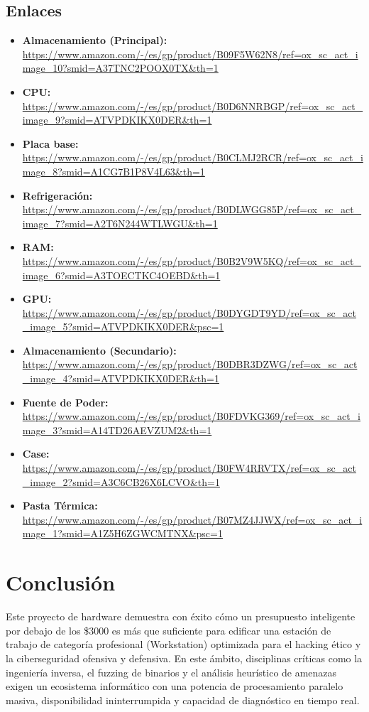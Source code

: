 \documentclass[12pt, a4paper]{article}
\begin{document}
\subsection*{Enlaces}
\begin{itemize}
    \item \textbf{Almacenamiento (Principal):} \url{https://www.amazon.com/-/es/gp/product/B09F5W62N8/ref=ox_sc_act_image_10?smid=A37TNC2POOX0TX&th=1}
    \item \textbf{CPU:} \url{https://www.amazon.com/-/es/gp/product/B0D6NNRBGP/ref=ox_sc_act_image_9?smid=ATVPDKIKX0DER&th=1}
    \item \textbf{Placa base:} \url{https://www.amazon.com/-/es/gp/product/B0CLMJ2RCR/ref=ox_sc_act_image_8?smid=A1CG7B1P8V4L63&th=1}
    \item \textbf{Refrigeración:} \url{https://www.amazon.com/-/es/gp/product/B0DLWGG85P/ref=ox_sc_act_image_7?smid=A2T6N244WTLWGU&th=1}
    \item \textbf{RAM:} \url{https://www.amazon.com/-/es/gp/product/B0B2V9W5KQ/ref=ox_sc_act_image_6?smid=A3TOECTKC4OEBD&th=1}
    \item \textbf{GPU:} \url{https://www.amazon.com/-/es/gp/product/B0DYGDT9YD/ref=ox_sc_act_image_5?smid=ATVPDKIKX0DER&psc=1}
    \item \textbf{Almacenamiento (Secundario):} \url{https://www.amazon.com/-/es/gp/product/B0DBR3DZWG/ref=ox_sc_act_image_4?smid=ATVPDKIKX0DER&th=1}
    \item \textbf{Fuente de Poder:} \url{https://www.amazon.com/-/es/gp/product/B0FDVKG369/ref=ox_sc_act_image_3?smid=A14TD26AEVZUM2&th=1}
    \item \textbf{Case:} \url{https://www.amazon.com/-/es/gp/product/B0FW4RRVTX/ref=ox_sc_act_image_2?smid=A3C6CB26X6LCVO&th=1}
    \item \textbf{Pasta Térmica:} \url{https://www.amazon.com/-/es/gp/product/B07MZ4JJWX/ref=ox_sc_act_image_1?smid=A1Z5H6ZGWCMTNX&psc=1}
\end{itemize}

\newpage
\section*{Conclusión}
Este proyecto de hardware demuestra con éxito cómo un presupuesto inteligente por debajo de los \$3000 es más que suficiente para edificar una estación de trabajo de categoría profesional (Workstation) optimizada para el hacking ético y la ciberseguridad ofensiva y defensiva. En este ámbito, disciplinas críticas como la ingeniería inversa, el fuzzing de binarios y el análisis heurístico de amenazas exigen un ecosistema informático con una potencia de procesamiento paralelo masiva, disponibilidad ininterrumpida y capacidad de diagnóstico en tiempo real.
\end{document}
